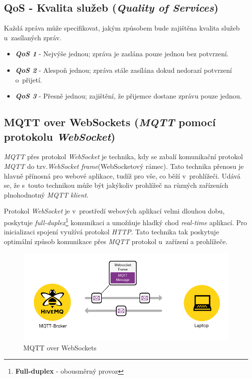 \newpage
\subsection*{QoS - Kvalita služeb (\emph{Quality of Services})}
Každá zpráva může specifikovat, jakým způsobem bude zajištěna kvalita služeb u~zasílaných zpráv.~\cite{wiki:mqtt_broker}
\begin{itemize}
  \item \textbf{\emph{QoS 1}} - Nejvýše jednou; zpráva je zaslána pouze jednou bez potvrzení.
  \item \textbf{\emph{QoS 2}} - Alespoň jednou; zpráva stále zasílána dokud nedorazí potvrzení o~přijetí.
  \item \textbf{\emph{QoS 3}} - Přesně jednou; zajištění, že přijemce dostane zprávu pouze jednou.
\end{itemize}

\subsection*{MQTT over WebSockets (\emph{MQTT} pomocí protokolu \emph{WebSocket})}
\label{mqtt:websockets}
\emph{MQTT} přes protokol \emph{WebSocket} je technika, kdy se zabalí komunikační protokol \emph{MQTT} do tzv.\emph{WebSocket frame}(WebSocketový rámec).
Tato technika přenosu je hlavně přínosná pro webové aplikace, tudíž pro vše, co běží v~prohlížeči.
Udává se, že s~touto technikou může být jakýkoliv prohlížeč na různých zařízeních plnohodnotný \emph{MQTT klient}.~\cite{mqtt:hivemq}

Protokol \emph{WebSocket} je v~prostředí webových aplikací velmi dlouhou dobu, poskytuje \emph{full-duplex}\footnote{\textbf{Full-duplex} - obousměrný provoz} komunikaci a umožňuje hladký chod \emph{real-time} aplikací.
Pro inicializaci spojení využívá protokol \emph{HTTP}.
Tato technika tak poskytuje optimální způsob komunikace přes \emph{MQTT} protokol u~zařízení a prohlížeče.

\begin{figure}[ht]
  \centering
  \includegraphics[width=1 \linewidth]{obrazky-figures/mqtt_websocket.png}
  \caption{MQTT over WebSockets}
  \label{figure:mqtt_websockets}
\end{figure}

